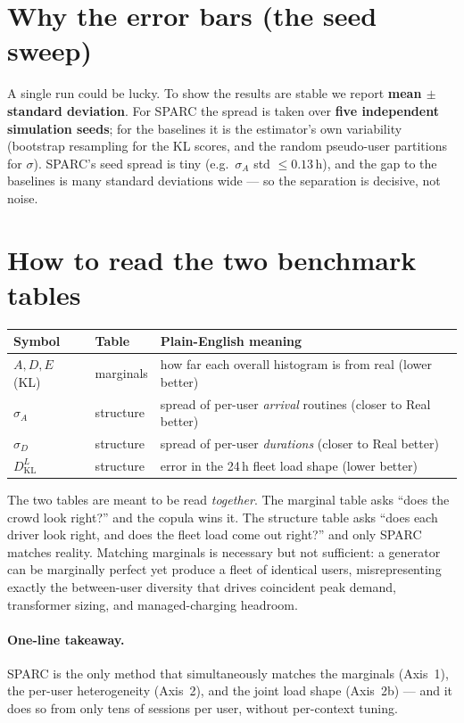 \documentclass[11pt]{article}
\newcommand{\kl}{D_{\mathrm{KL}}}
\begin{document}
\section{Why the error bars (the seed sweep)}
A single run could be lucky. To show the results are stable we report \textbf{mean $\pm$ standard deviation}. For SPARC the spread is taken over \textbf{five independent simulation seeds}; for the baselines it is the estimator's own variability (bootstrap resampling for the KL scores, and the random pseudo-user partitions for $\sigma$). SPARC's seed spread is tiny (e.g.\ $\sigma_A$ std $\le0.13$\,h), and the gap to the baselines is many standard deviations wide --- so the separation is decisive, not noise.

\section{How to read the two benchmark tables}
\begin{table}[h]
\centering
\small
\begin{tabular}{@{}lll@{}}
\toprule
Symbol & Table & Plain-English meaning \\
\midrule
$A,D,E$ (KL) & marginals & how far each overall histogram is from real (lower better) \\
$\sigma_A$ & structure & spread of per-user \emph{arrival} routines (closer to Real better) \\
$\sigma_D$ & structure & spread of per-user \emph{durations} (closer to Real better) \\
$\kl^{L}$ & structure & error in the 24\,h fleet load shape (lower better) \\
\bottomrule
\end{tabular}
\end{table}

The two tables are meant to be read \emph{together}. The marginal table asks ``does the crowd look right?'' and the copula wins it. The structure table asks ``does each driver look right, and does the fleet load come out right?'' and only SPARC matches reality. Matching marginals is necessary but not sufficient: a generator can be marginally perfect yet produce a fleet of identical users, misrepresenting exactly the between-user diversity that drives coincident peak demand, transformer sizing, and managed-charging headroom.

\paragraph{One-line takeaway.} SPARC is the only method that simultaneously matches the marginals (Axis~1), the per-user heterogeneity (Axis~2), and the joint load shape (Axis~2b) --- and it does so from only tens of sessions per user, without per-context tuning.
\end{document}
